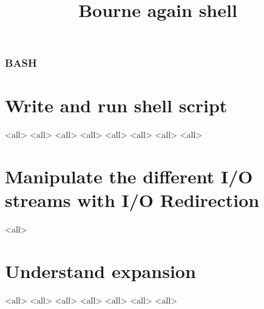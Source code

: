 
\title[bash]{Bourne again shell}




\begin{frame}
	\frametitle{BASH}
	\titlepage
	\vspace{-0.5cm}
	\begin{center}
	\end{center}
\end{frame}

\begin{frame}
	\tableofcontents
\end{frame}




\section{Write and run shell script}
\mode<all>{}
\mode<all>{}
\mode<all>{}
\mode<all>{}
\mode<all>{}
\mode<all>{}
\mode<all>{}
\mode<all>{}

\section{Manipulate the different I/O streams  with I/O Redirection}
\mode<all>{}


\section{Understand expansion}
\mode<all>{}
\mode<all>{}
\mode<all>{}
\mode<all>{}
\mode<all>{}
\mode<all>{}
\mode<all>{}

